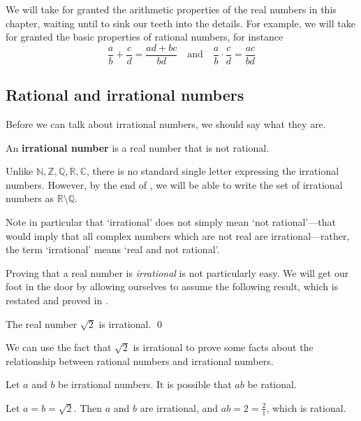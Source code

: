 We will take for granted the arithmetic properties of the real numbers in this chapter, waiting until  to sink our teeth into the details. For example, we will take for granted the basic properties of rational numbers, for instance
\[ \frac{a}{b}+\frac{c}{d} = \frac{ad+bc}{bd} \quad \text{and} \quad \frac{a}{b} \cdot \frac{c}{d} = \frac{ac}{bd} \]

\subsection*{Rational and irrational numbers}
\label{pGettingStartedRationalNumbers}

Before we can talk about irrational numbers, we should say what they are.

\begin{definition}
\label{defIrrationalNumber}
An \textbf{irrational number} is a real number that is not rational.
\end{definition}

Unlike $\mathbb{N},\mathbb{Z},\mathbb{Q},\mathbb{R},\mathbb{C}$, there is no standard single letter expressing the irrational numbers. However, by the end of , we will be able to write the set of irrational numbers as $\mathbb{R} \setminus \mathbb{Q}$.

Note in particular that `irrational' does not simply mean `not rational'---that would imply that all complex numbers which are not real are irrational---rather, the term `irrational' means `real and not rational'.

Proving that a real number is \textit{irrational} is not particularly easy. We will get our foot in the door by allowing ourselves to assume the following result, which is restated and proved in .

\begin{proposition}
\label{propSqrt2IrrationalPreliminary}
The real number $\sqrt{2}$ is irrational. \qed
\end{proposition}

We can use the fact that $\sqrt{2}$ is irrational to prove some facts about the relationship between rational numbers and irrational numbers.

\begin{proposition}
Let $a$ and $b$ be irrational numbers. It is possible that $ab$ be rational.
\end{proposition}

\begin{cproof}
Let $a=b=\sqrt{2}$. Then $a$ and $b$ are irrational, and $ab=2=\frac{2}{1}$, which is rational.
\end{cproof}

